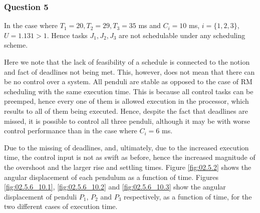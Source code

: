 \subsubsection{Question 5}
In the case where $T_1 = 20, T_2 = 29, T_3 = 35$ ms and $C_i = 10$ ms,
$i=\{1,2,3\}$, $U=1.131 > 1$. Hence tasks $J_1, J_2, J_3$ are not schedulable
under any scheduling scheme.



Here we note that the lack of feasibility of a schedule is connected to the
notion and fact of deadlines not being met. This, however, does not mean that
there can be no control over a system. All penduli are stable as opposed to the
case of RM scheduling with the same execution time. This is because all control
tasks can be preemped, hence every one of them is allowed execution in the
processor, which results to all of them being executed. Hence, despite the fact
that deadlines are missed, it is possible to control all three penduli, although
it may be with worse control performance than in the case where $C_i = 6$ ms.

Due to the missing of deadlines, and, ultimately, due to the increased execution
time, the control input is not as swift as before, hence the increased magnitude
of the overshoot and the larger rise and settling times. Figure \ref{fig:02.5.2}
shows the angular displacement of each pendulum as a function of time.
Figures \ref{fig:02.5.6_10.1}, \ref{fig:02.5.6_10.2} and \ref{fig:02.5.6_10.3}
show the angular displacement of penduli $P_1$, $P_2$ and $P_3$ respectively, as
a function of time, for the two different cases of execution time.

\noindent{}

